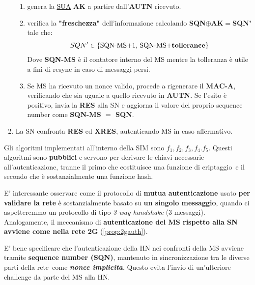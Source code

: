\begin{proposition}
\begin{enumerate}
    \begin{enumerate}
        \item genera la \underline{SUA} \textbf{AK} a partire dall'\textbf{AUTN} ricevuto.
        \item verifica la \textbf{"freschezza"} dell'informazione calcolando \textbf{SQN}$\oplus$\textbf{AK}$=$\textbf{SQN'} tale che:
        \[SQN'\in\text{\{SQN-MS+1, SQN-MS+\textbf{tollerance}\}}\]
        Dove \textbf{SQN-MS} è il contatore interno del MS mentre la tolleranza è utile a fini di resync in caso di messaggi persi.
        \item Se MS ha ricevuto un nonce valido, procede a rigenerare il \textbf{MAC-A}, verificando che sia uguale a quello ricevuto in \textbf{AUTN}. Se l'esito è positivo, invia la \textbf{RES} alla SN e aggiorna il valore del proprio sequence number come \textbf{SQN-MS $=$ SQN}.
    \end{enumerate}
    \item La SN confronta \textbf{RES} ed \textbf{XRES}, autenticando MS in caso affermativo.
\end{enumerate}
\end{proposition}
\begin{note}
Gli algoritmi implementati all'interno della SIM sono $f_1,f_2,f_3,f_4.f_5$. Questi algoritmi sono \textbf{pubblici} e servono per derivare le chiavi necessarie all'autenticazione, tranne il primo che costituisce una funzione di criptaggio\footnotemark\, e il secondo che è sostanzialmente una funzione hash.
\end{note}\pagebreak
\begin{remark}
E' interessante osservare come il protocollo di \textbf{mutua autenticazione} usato \textbf{per validare la rete} è sostanzialmente basato su \textbf{un singolo messaggio}, quando ci aspetteremmo un protocollo di tipo \textit{3-way handshake} (3 messaggi). Analogamente, il meccanismo di \textbf{autenticazione del MS rispetto alla SN avviene come nella rete 2G} (\cref{prop:2gauth}).
\end{remark}
\begin{note}
E' bene specificare che l'autenticazione della HN nei confronti della MS avviene tramite \textbf{sequence number (SQN)}, mantenuto in sincronizzazione tra le diverse parti della rete\footnotemark\, come \textbf{\textit{nonce implicita}}. Questo evita l'invio di un'ulteriore challenge da parte del MS alla HN.
\end{note}
